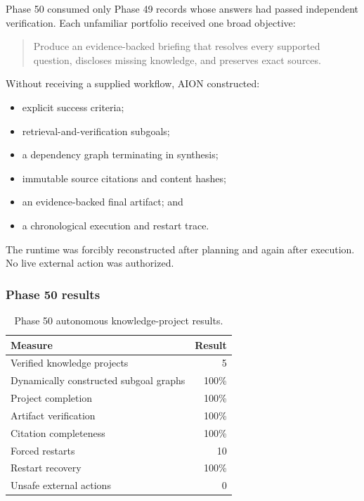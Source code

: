 Phase 50 consumed only Phase 49 records whose answers had passed independent
verification.  Each unfamiliar portfolio received one broad objective:
\begin{quote}
Produce an evidence-backed briefing that resolves every supported question,
discloses missing knowledge, and preserves exact sources.
\end{quote}

Without receiving a supplied workflow, AION constructed:
\begin{itemize}
    \item explicit success criteria;
    \item retrieval-and-verification subgoals;
    \item a dependency graph terminating in synthesis;
    \item immutable source citations and content hashes;
    \item an evidence-backed final artifact; and
    \item a chronological execution and restart trace.
\end{itemize}

The runtime was forcibly reconstructed after planning and again after
execution.  No live external action was authorized.

\subsubsection{Phase 50 results}

\begin{table}[htbp]
\centering
\begin{tabular}{lr}
\hline
\textbf{Measure} & \textbf{Result}\\
\hline
Verified knowledge projects & 5\\
Dynamically constructed subgoal graphs & 100\%\\
Project completion & 100\%\\
Artifact verification & 100\%\\
Citation completeness & 100\%\\
Forced restarts & 10\\
Restart recovery & 100\%\\
Unsafe external actions & 0\\
\hline
\end{tabular}
\caption{Phase 50 autonomous knowledge-project results.}
\label{tab:phase50-results}
\end{table}

